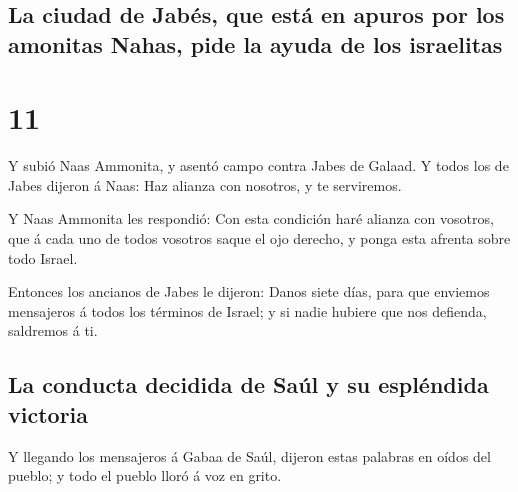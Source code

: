\hypertarget{la-ciudad-de-jabuxe9s-que-estuxe1-en-apuros-por-los-amonitas-nahas-pide-la-ayuda-de-los-israelitas}{%
\subsection{La ciudad de Jabés, que está en apuros por los amonitas
Nahas, pide la ayuda de los
israelitas}\label{la-ciudad-de-jabuxe9s-que-estuxe1-en-apuros-por-los-amonitas-nahas-pide-la-ayuda-de-los-israelitas}}

\hypertarget{section-10}{%
\section{11}\label{section-10}}

 Y subió Naas Ammonita, y asentó campo contra Jabes de
Galaad. Y todos los de Jabes dijeron á Naas: Haz alianza con nosotros, y
te serviremos.

 Y Naas Ammonita les respondió: Con esta condición haré
alianza con vosotros, que á cada uno de todos vosotros saque el ojo
derecho, y ponga esta afrenta sobre todo Israel.

 Entonces los ancianos de Jabes le dijeron: Danos siete
días, para que enviemos mensajeros á todos los términos de Israel; y si
nadie hubiere que nos defienda, saldremos á ti.

\hypertarget{la-conducta-decidida-de-sauxfal-y-su-espluxe9ndida-victoria}{%
\subsection{La conducta decidida de Saúl y su espléndida
victoria}\label{la-conducta-decidida-de-sauxfal-y-su-espluxe9ndida-victoria}}

 Y llegando los mensajeros á Gabaa de Saúl, dijeron estas
palabras en oídos del pueblo; y todo el pueblo lloró á voz en grito.


